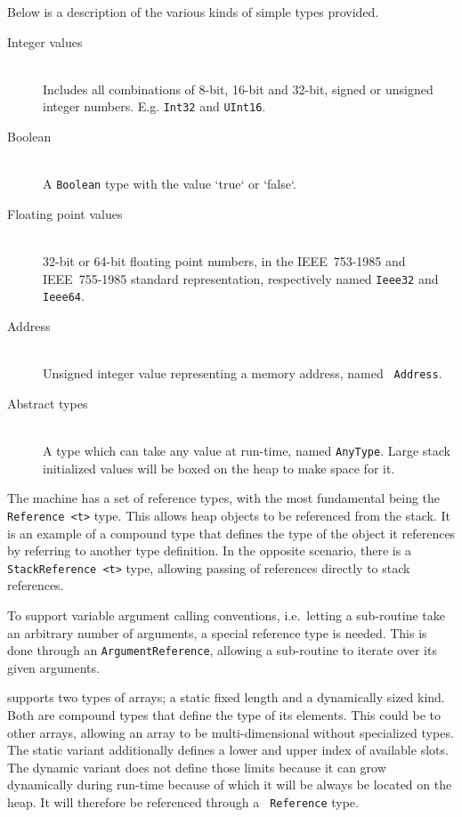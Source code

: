 Below is a description of the various kinds of simple types provided.

\begin{description}
\item[Integer values] \hfill\\
  Includes all combinations of 8-bit, 16-bit and 32-bit, signed or unsigned
  integer numbers. E.g. {\tt Int32} and {\tt UInt16}.

\item[Boolean] \hfill\\
  A {\tt Boolean} type with the value `true` or `false`.

\item[Floating point values] \hfill\\
  32-bit or 64-bit floating point numbers, in the IEEE~753-1985 and
  IEEE~755-1985 standard representation, respectively named {\tt Ieee32} and
  {\tt Ieee64}.

\item[Address] \hfill\\
  Unsigned integer value representing a memory address, named {\tt
    Address}.

\item[Abstract types] \hfill\\
  A type which can take any value at run-time, named {\tt AnyType}. Large stack
  initialized values will be boxed on the heap to make space for it.
\end{description}


The machine has a set of reference types, with the most fundamental being the
{\tt Reference <t>} type. This allows heap objects to be referenced from the
stack. It is an example of a compound type that defines the type of the object
it references by referring to another type definition. In the opposite scenario,
there is a {\tt StackReference <t>} type, allowing passing of references
directly to stack references.

To support variable argument calling conventions, i.e.~letting a sub-routine
take an arbitrary number of arguments, a special reference type is needed. This
is done through an {\tt ArgumentReference}, allowing a sub-routine to iterate
over its given arguments.


\thename{} supports two types of arrays; a static fixed length and a dynamically
sized kind. Both are compound types that define the type of its elements. This
could be to other arrays, allowing an array to be multi-dimensional without
specialized types. The static variant additionally defines a lower and upper
index of available slots. The dynamic variant does not define those limits
because it can grow dynamically during run-time because of which it will be
always be located on the heap. It will therefore be referenced through a {\tt
  Reference} type.

